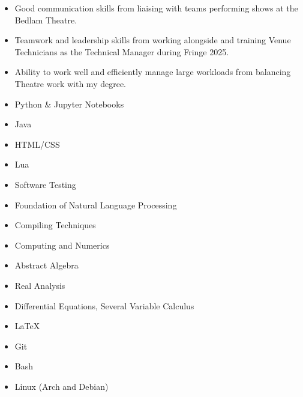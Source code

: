 \documentclass[../../cv-cs.tex]{subfiles}
\begin{document}
\begin{itemize}
	\item Good communication skills from liaising with teams performing shows at the Bedlam Theatre.
	\item Teamwork and leadership skills from working alongside and training Venue Technicians as the Technical Manager during Fringe 2025.
	\item Ability to work well and efficiently manage large workloads from balancing Theatre work with my degree. 
\end{itemize}

\begin{itemize}
	\item Python \& Jupyter Notebooks
	\item Java
	\item HTML/CSS
	\item Lua
\end{itemize}

\begin{itemize}
	\item Software Testing
	\item Foundation of Natural Language Processing
	\item Compiling Techniques
	\item Computing and Numerics
\end{itemize}

\begin{itemize}
	\item Abstract Algebra
	\item Real Analysis
	\item Differential Equations, Several Variable Calculus
\end{itemize}

\begin{itemize}
	\item LaTeX
	\item Git
	\item Bash
	\item Linux (Arch and Debian)
\end{itemize}
\end{document}
